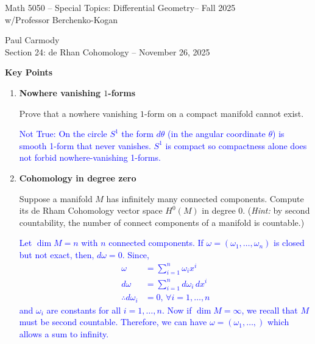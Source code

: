 \documentclass[12pt,a4paper]{report}
\newcommand{\CLASSNAME}{Math 5050 -- Special Topics: Differential Geometry}
\newcommand{\STUDENTNAME}{Paul Carmody}
\newcommand{\ASSIGNMENT}{Section 24: de Rhan Cohomology }
\newcommand{\DUEDATE}{November 26, 2025}
\newcommand{\PROFESSOR}{Professor Berchenko-Kogan}
\newcommand{\SEMESTER}{Fall 2025}
\newcommand{\BLUE}[1]{\textcolor{blue}{#1}}
\begin{document}
\begin{center}
	\Large{\CLASSNAME -- \SEMESTER} \\
	\large{ w/\PROFESSOR}
\end{center}
\begin{center}
	\STUDENTNAME \\
	\ASSIGNMENT -- \DUEDATE\\
\end{center} 

\textbf{Key Points}

\HLINE
\begin{enumerate}[label=24.\arabic*]

\item \textbf{Nowhere vanishing $1$-forms}

Prove that a nowhere vanishing $1$-form on a compact manifold cannot exist.

\BLUE{Not True: On the circle $S^1$ the form $d\theta$ (in the angular coordinate $\theta$) is smooth 1-form that never vanishes.  $S^1$ is compact so compactness alone does not forbid nowhere-vanishing 1-forms.
}

\item \textbf{Cohomology in degree zero}

Suppose a manifold $M$ has infinitely many connected components.  Compute its de Rham Cohomology vector space $H^0(M)$ in degree 0. (\textit{Hint:}  by second countability,  the number of connect components of a manifold is countable.)

\BLUE{Let $\dim M = n$ with $n$ connected components.  If $\omega = (\omega_1,\dots,\omega_n)$ is closed but not exact, then, $d\omega = 0$.  Since, 
\begin{align*}
	\omega &= \sum_{i=1}^n \omega_i x^i\\
	d\omega &= \sum_{i=1}^n d\omega_i \,dx^i \\
	\therefore d\omega_i &= 0, \, \forall i=1,\dots,n
\end{align*}and $\omega_i$ are constants for all $i=1,\dots,n$.  Now if $\dim M = \infty$, we recall that $M$ must be second countable.  Therefore, we can have $\omega = (\omega_1, \dots, )$ which allows a sum to infinity.
}

\end{enumerate}
\end{document}

